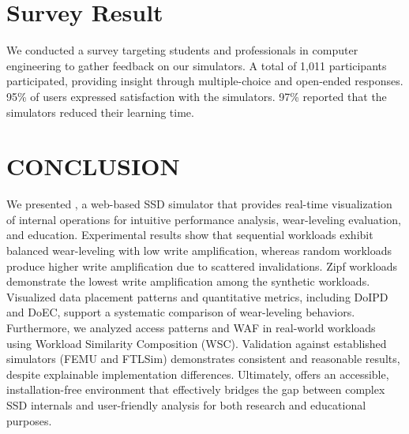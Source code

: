 \documentclass{ieeeaccess}
\begin{document}
\section{Survey Result}
\label{survey_result}
We conducted a survey targeting students and professionals in computer engineering to gather feedback on our simulators. A total of 1,011 participants participated, providing insight through multiple-choice and open-ended responses. 95\% of users expressed satisfaction with the simulators. 97\% reported that the simulators reduced their learning time.

\section{CONCLUSION}
\label{conclusion}
We presented \eyanassdsim, a web-based SSD simulator that provides real-time visualization of internal operations for intuitive performance analysis, wear-leveling evaluation, and education. Experimental results show that sequential workloads exhibit balanced wear-leveling with low write amplification, whereas random workloads produce higher write amplification due to scattered invalidations. Zipf workloads demonstrate the lowest write amplification among the synthetic workloads. Visualized data placement patterns and quantitative metrics, including DoIPD and DoEC, support a systematic comparison of wear-leveling behaviors. Furthermore, we analyzed access patterns and WAF in real-world workloads using Workload Similarity Composition (WSC). Validation against established simulators (FEMU and FTLSim) demonstrates consistent and reasonable results, despite explainable implementation differences. Ultimately, \eyanassdsim offers an accessible, installation-free environment that effectively bridges the gap between complex SSD internals and user-friendly analysis for both research and educational purposes.

\end{document}
